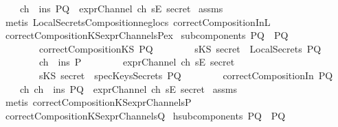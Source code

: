\begin{isabellebody}
\ \ \ \ {\isachardoublequoteopen}ch\ {\isasymin}\ ins\ PQ\ {\isasymand}\ exprChannel\ ch\ {\isacharparenleft}sE\ secret{\isacharparenright}{\isachardoublequoteclose}\isanewline
%
\isadelimproof
%
\endisadelimproof
%
\isatagproof
{}\isamarkupfalse%
\ assms\isanewline
{}\isamarkupfalse%
\ {\isacharparenleft}metis\ LocalSecretsComposition{\isacharunderscore}neg{\isacharunderscore}loc{\isacharunderscore}s\ correctCompositionIn{\isacharunderscore}L{}{\isacharparenright}%
\endisatagproof
{\isafoldproof}%
%
\isadelimproof
\isanewline
%
\endisadelimproof
\isanewline
{}\isamarkupfalse%
\ correctCompositionKS{\isacharunderscore}exprChannel{\isacharunderscore}s{\isacharunderscore}Pex{\isacharcolon}\isanewline
{}\ {\isachardoublequoteopen}subcomponents\ PQ\ {\isacharequal}\ {\isacharbraceleft}P{\isacharcomma}Q{\isacharbraceright}{\isachardoublequoteclose}\ \isanewline
\ \ \ \ \ \ \ \ {\isachardoublequoteopen}correctCompositionKS\ PQ{\isachardoublequoteclose}\isanewline
\ \ \ \ \ \ \ \ {\isachardoublequoteopen}sKS\ secret\ {\isasymnotin}\ LocalSecrets\ PQ{\isachardoublequoteclose}\isanewline
\ \ \ \ \ \ \ \ {\isachardoublequoteopen}ch\ {\isasymin}\ ins\ P{\isachardoublequoteclose}\isanewline
\ \ \ \ \ \ \ \ {\isachardoublequoteopen}exprChannel\ ch\ {\isacharparenleft}sE\ secret{\isacharparenright}{\isachardoublequoteclose}\isanewline
\ \ \ \ \ \ \ \ {\isachardoublequoteopen}sKS\ secret\ {\isasymnotin}\ specKeysSecrets\ PQ{\isachardoublequoteclose}\isanewline
\ \ \ \ \ \ \ \ {\isachardoublequoteopen}correctCompositionIn\ PQ{\isachardoublequoteclose}\isanewline
{}\ \ \ \ {\isachardoublequoteopen}{\isasymexists}ch{\isachardot}\ ch\ {\isasymin}\ ins\ PQ\ {\isasymand}\ exprChannel\ ch\ {\isacharparenleft}sE\ secret{\isacharparenright}{\isachardoublequoteclose}\isanewline
%
\isadelimproof
%
\endisadelimproof
%
\isatagproof
{}\isamarkupfalse%
\ assms\ \ \isanewline
{}\isamarkupfalse%
\ {\isacharparenleft}metis\ correctCompositionKS{\isacharunderscore}exprChannel{\isacharunderscore}s{\isacharunderscore}P{\isacharparenright}%
\endisatagproof
{\isafoldproof}%
%
\isadelimproof
\isanewline
%
\endisadelimproof
\isanewline
{}\isamarkupfalse%
\ correctCompositionKS{\isacharunderscore}exprChannel{\isacharunderscore}s{\isacharunderscore}Q{\isacharcolon}\isanewline
{}\ h{}{\isacharcolon}{\isachardoublequoteopen}subcomponents\ PQ\ {\isacharequal}\ {\isacharbraceleft}P{\isacharcomma}Q{\isacharbraceright}{\isachardoublequoteclose}\ \isanewline

\end{isabellebody}
